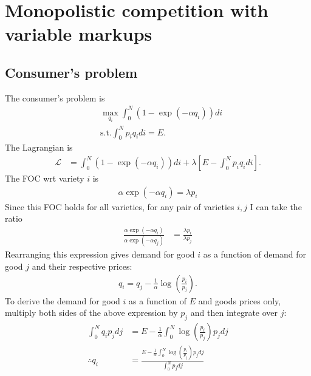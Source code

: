 \documentclass[12pt]{article}
\begin{document}
\newpage

\section{Monopolistic competition with variable markups}

\subsection{Consumer's problem}
The consumer's problem is 
\begin{align*}
&\max_{q_i} \int_0^N (1-\exp(-\alpha q_i) )di\\
&\text{s.t.} \int_0^N p_i q_i di = E.
\end{align*}
The Lagrangian is
\begin{align*}
\mathcal{L} &=  \int_0^N (1-\exp(-\alpha q_i)) di + \lambda \left[ E -\int_0^N p_i q_i di \right].
\end{align*}
The FOC wrt variety $i$ is
\begin{align*}
\alpha \exp(-\alpha q_i) = \lambda p_i
\end{align*}
Since this FOC holds for all varieties, for any pair of varieties $i, j$ I can take the ratio
\begin{align*}
\frac{\alpha \exp(-\alpha q_i)}{\alpha \exp(-\alpha q_j)} & = \frac{\lambda p_i}{\lambda p_j}
\end{align*}
Rearranging this expression gives demand for good $i$ as a function of demand for good $j$ and their respective prices:
\begin{align}
q_i = q_j - \frac{1}{\alpha} \log\left(\frac{p_i}{p_j}\right). \label{eq:mpc1}
\end{align}
To derive the demand for good $i$ as a function of $E$ and goods prices only, multiply both sides of the above expression by $p_j$ and then integrate over $j$:
\begin{align}
\int_0^N q_i p_j dj &= E - \frac{1}{\alpha}\int_0^N \log\left(\frac{p_i}{p_j}\right)p_j dj \nonumber\\
\therefore q_i &=  \frac{E - \frac{1}{\alpha}\int_0^N \log\left(\frac{p_i}{p_j}\right)p_j dj}{\int_0^Np_j dj} \label{eq:mpc2a}
\end{align}
\end{document}
